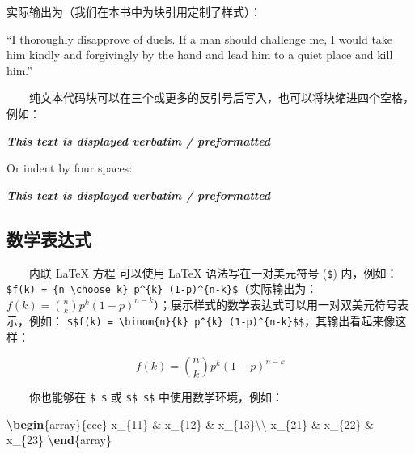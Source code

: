 \documentclass[
  12pt,
]{krantz}
\newenvironment{Shaded}{\begin{snugshade}}{\end{snugshade}}
\newcommand{\ExtensionTok}[1]{#1}
\newcommand{\InformationTok}[1]{\textcolor[rgb]{0.56,0.35,0.01}{\textbf{\textit{#1}}}}
\newcommand{\KeywordTok}[1]{\textcolor[rgb]{0.13,0.29,0.53}{\textbf{#1}}}
\newcommand{\NormalTok}[1]{#1}
\newcommand{\SpecialCharTok}[1]{\textcolor[rgb]{0.00,0.00,0.00}{#1}}
\newcommand{\SpecialStringTok}[1]{\textcolor[rgb]{0.31,0.60,0.02}{#1}}
\renewenvironment{quote}{\begin{VF}}{\end{VF}}
\theoremstyle{definition}
\theoremstyle{definition}
\theoremstyle{definition}
\theoremstyle{definition}
\theoremstyle{remark}
\begin{document}
实际输出为（我们在本书中为块引用定制了样式）：

\begin{quote}
``I thoroughly disapprove of duels. If a man should challenge me,
I would take him kindly and forgivingly by the hand and lead him
to a quiet place and kill him.''

\end{quote}

  纯文本代码块可以在三个或更多的反引号后写入，也可以将块缩进四个空格，例如：

\begin{Shaded}
\begin{Highlighting}[]
\InformationTok{\textasciigrave{}\textasciigrave{}\textasciigrave{}}
\InformationTok{This text is displayed verbatim / preformatted}
\InformationTok{\textasciigrave{}\textasciigrave{}\textasciigrave{}}

\NormalTok{Or indent by four spaces:}

\InformationTok{    This text is displayed verbatim / preformatted}
\end{Highlighting}
\end{Shaded}

\hypertarget{ux6570ux5b66ux8868ux8fbeux5f0f}{%
\subsection{数学表达式}\label{ux6570ux5b66ux8868ux8fbeux5f0f}}

  内联 LaTeX 方程 可以使用 LaTeX 语法写在一对美元符号 (\texttt{\$}) 内，例如：\texttt{\$f(k)\ =\ \{n\ \textbackslash{}choose\ k\}\ p\^{}\{k\}\ (1-p)\^{}\{n-k\}\$}（实际输出为：\(f(k)=\binom{n}{k}p^{k}(1-p)^{n-k}\)）；展示样式的数学表达式可以用一对双美元符号表示，例如： \texttt{\$\$f(k)\ =\ \textbackslash{}binom\{n\}\{k\}\ p\^{}\{k\}\ (1-p)\^{}\{n-k\}\$\$}，其输出看起来像这样：

\[f\left(k\right)=\binom{n}{k}p^k\left(1-p\right)^{n-k}\]

  你也能够在 \texttt{\$\ \$} 或 \texttt{\$\$\ \$\$} 中使用数学环境，例如：

\begin{Shaded}
\begin{Highlighting}[]
\SpecialStringTok{$$}\KeywordTok{\textbackslash{}begin}\NormalTok{\{}\ExtensionTok{array}\NormalTok{\}}\SpecialStringTok{\{ccc\}}
\SpecialStringTok{x\_\{11\} \& x\_\{12\} \& x\_\{13\}}\SpecialCharTok{\textbackslash{}\textbackslash{}}
\SpecialStringTok{x\_\{21\} \& x\_\{22\} \& x\_\{23\}}
\KeywordTok{\textbackslash{}end}\NormalTok{\{}\ExtensionTok{array}\NormalTok{\}}\SpecialStringTok{$$}
\end{Highlighting}
\end{Shaded}
\end{document}
